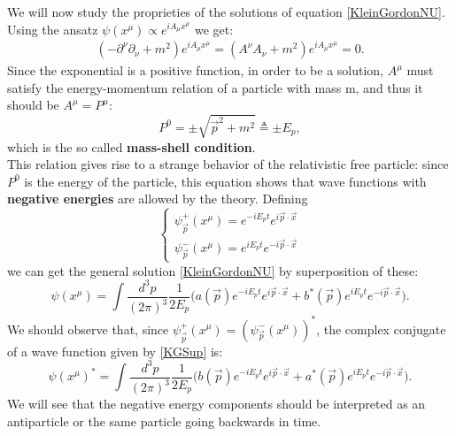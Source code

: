 We will now study the proprieties of the solutions of equation \eqref{KleinGordonNU}.\\Using the ansatz $\psi(x^\mu)\propto e^{iA_\mu x^\mu}$ we get:
\begin{align*}
    (-\partial^\nu\partial_\nu+m^2)e^{iA_\mu x^\mu}=(A^\nu A_\nu+m^2)e^{iA_\mu x^\mu}=0.
\end{align*}
Since the exponential is a positive function, in order to be a solution, $A^\mu$ must satisfy the energy-momentum relation of a particle with mass m, and thus it should be $A^\mu=P^\mu$:
\begin{equation}\label{mass-shellCondition}
    P^0=\pm\sqrt{\vec p^2+m^2}\triangleq \pm E_p,
\end{equation} 
which is the so called \textbf{mass-shell condition}.\\This relation gives rise to a strange behavior of the relativistic free particle: since $P^0$ is the energy of the particle, this equation shows that wave functions with \textbf{negative energies} are allowed by the theory. Defining
\begin{equation*}
    \begin{cases}
        \psi^+_{\vec p}(x^\mu)=e^{-iE_pt}e^{i\vec p\cdot \vec x}\\
        \psi^-_{\vec p}(x^\mu)=e^{iE_pt}e^{-i\vec p\cdot \vec x}
    \end{cases}
\end{equation*}
we can get the general solution \eqref{KleinGordonNU} by superposition of these:
\begin{equation}\label{KGSup}
    \psi(x^\mu)=\int\frac{d^3p}{(2\pi)^3}\frac{1}{2E_p}\biggl(a(\vec p)e^{-iE_pt}e^{i\vec p\cdot \vec x}+b^*(\vec p)e^{iE_pt}e^{-i\vec p\cdot \vec x}\biggr).
\end{equation}
We should observe that, since $   \psi^+_{\vec p}(x^\mu)=  (\psi^-_{\vec p}(x^\mu))^*$, the complex conjugate of a wave function given by \eqref{KGSup} is:
\begin{equation*}
    \psi(x^\mu)^*=\int\frac{d^3p}{(2\pi)^3}\frac{1}{2E_p}\biggl(b(\vec p)e^{-iE_pt}e^{i\vec p\cdot \vec x}+a^*(\vec p)e^{iE_pt}e^{-i\vec p\cdot \vec x}\biggr).
\end{equation*}
We will see that the negative energy components should be interpreted as an antiparticle or the same particle going backwards in time.

